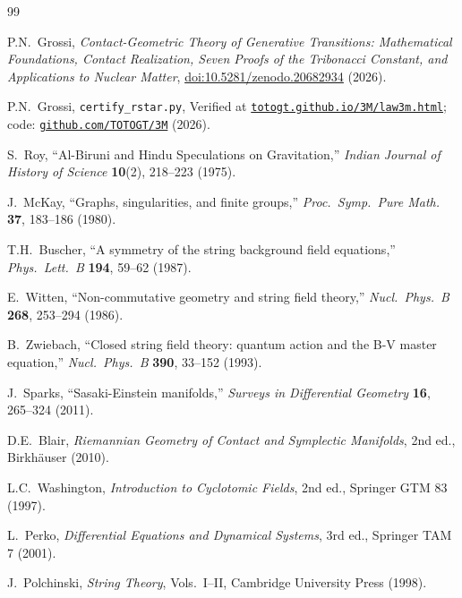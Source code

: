 \documentclass[12pt,a4paper]{article}
\theoremstyle{plain}
\theoremstyle{definition}
\theoremstyle{remark}
\begin{document}
\begin{thebibliography}{99}

P.N.~Grossi,
\textit{Contact-Geometric Theory of Generative Transitions: Mathematical Foundations,
Contact Realization, Seven Proofs of the Tribonacci Constant, and Applications to
Nuclear Matter},
\href{https://doi.org/10.5281/zenodo.20682934}{doi:10.5281/zenodo.20682934} (2026).

P.N.~Grossi, \texttt{certify\_rstar.py}, Verified at
\href{https://totogt.github.io/3M/law3m.html}{\texttt{totogt.github.io/3M/law3m.html}};
code: \href{https://github.com/TOTOGT/3M}{\texttt{github.com/TOTOGT/3M}} (2026).

S.~Roy, ``Al-Biruni and Hindu Speculations on Gravitation,''
\textit{Indian Journal of History of Science} \textbf{10}(2), 218--223 (1975).

J.~McKay, ``Graphs, singularities, and finite groups,''
\textit{Proc.\ Symp.\ Pure Math.} \textbf{37}, 183--186 (1980).

T.H.~Buscher, ``A symmetry of the string background field equations,''
\textit{Phys.\ Lett.\ B} \textbf{194}, 59--62 (1987).

E.~Witten, ``Non-commutative geometry and string field theory,''
\textit{Nucl.\ Phys.\ B} \textbf{268}, 253--294 (1986).

B.~Zwiebach, ``Closed string field theory: quantum action and the
B-V master equation,'' \textit{Nucl.\ Phys.\ B} \textbf{390}, 33--152 (1993).

J.~Sparks, ``Sasaki-Einstein manifolds,''
\textit{Surveys in Differential Geometry} \textbf{16}, 265--324 (2011).

D.E.~Blair, \textit{Riemannian Geometry of Contact and Symplectic Manifolds},
2nd ed., Birkhäuser (2010).

L.C.~Washington, \textit{Introduction to Cyclotomic Fields},
2nd ed., Springer GTM 83 (1997).

L.~Perko, \textit{Differential Equations and Dynamical Systems},
3rd ed., Springer TAM 7 (2001).

J.~Polchinski, \textit{String Theory}, Vols.~I--II,
Cambridge University Press (1998).


\end{thebibliography}
\end{document}
